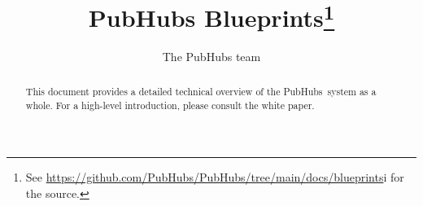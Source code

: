 \documentclass[a4paper]{amsbook}
\begin{document}
\frontmatter

\title{PubHubs Blueprints\footnote{See
	\url{https://github.com/PubHubs/PubHubs/tree/main/docs/blueprints}i for the source.}}

\author{The PubHubs team}


\begin{abstract}
	This document provides a detailed technical overview of the PubHubs\ system as a whole.
For a high-level introduction,
	please consult the white paper\cite{whitepaper}.

\end{abstract}

\maketitle

\setcounter{page}{4}

\tableofcontents

\mainmatter

\appendix

\backmatter




\printindex
\end{document}
